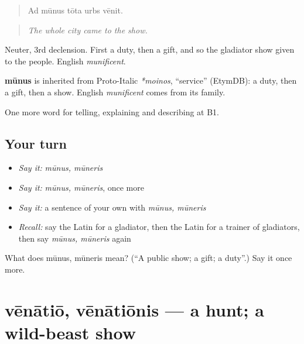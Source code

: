\begin{quote}
Ad mūnus tōta urbs vēnit.
\end{quote}

\begin{quote}
\emph{The whole city came to the show.}
\end{quote}

Neuter, 3rd declension. First a duty, then a gift, and so the gladiator show given to the people. English \emph{munificent}.

\begin{cousinweb}
\textbf{mūnus} is inherited from Proto-Italic \emph{*moinos}, \textquotedblleft{}service\textquotedblright{} (EtymDB): a duty, then a gift, then a show. English \emph{munificent} comes from its family.
\end{cousinweb}

\begin{grammarlens}[title={What you've built}]
One more word for telling, explaining and describing at B1.
\end{grammarlens}

\subsection*{Your turn}
\begin{itemize}
\raggedright
  \item \emph{Say it:} \emph{mūnus, mūneris}
  \item \emph{Say it:} \emph{mūnus, mūneris}, once more
  \item \emph{Say it:} a sentence of your own with \emph{mūnus, mūneris}
  \item \emph{Recall:} say the Latin for a gladiator, then the Latin for a trainer of gladiators, then say \emph{mūnus, mūneris} again
\end{itemize}

\begin{tcolorbox}[breakable,colback=teal!4,colframe=teal!35!black,title={Before you move on}]
What does mūnus, mūneris mean? (\textquotedblleft{}A public show; a gift; a duty\textquotedblright{}.) Say it once more.
\end{tcolorbox}
\section[vēnātiō, vēnātiōnis]{vēnātiō, vēnātiōnis — a hunt; a wild-beast show}

\label{lesson:LA-C336-venatio}



